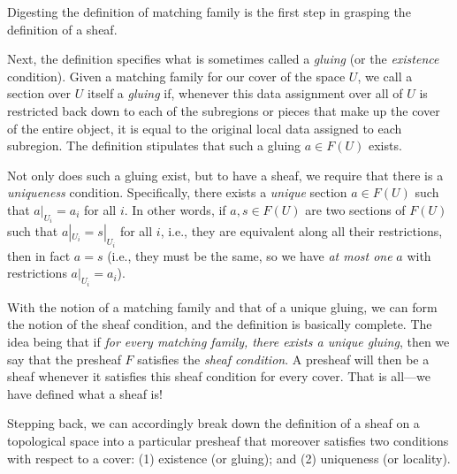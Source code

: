 \documentclass[a4paper]{book}
\theoremstyle{definition}
\theoremstyle{definition}
\theoremstyle{definition}
\theoremstyle{theorem}
\theoremstyle{definition}
\begin{document}
			Digesting the definition of matching family is the first step in grasping the definition of a sheaf. \par 
			Next, the definition specifies what is sometimes called a \textit{gluing} (or the \textit{existence} condition). Given a matching family for our cover of the space $U$, we call a section over $U$ itself a \textit{gluing} if, whenever this data assignment over all of $U$ is restricted back down to each of the subregions or pieces that make up the cover of the entire object, it is equal to the original local data assigned to each subregion. The definition stipulates that such a gluing $a \in F(U)$ exists.\par 
			Not only does such a gluing exist, but to have a sheaf, we require that there is a \textit{uniqueness} condition. Specifically, there exists a \textit{unique} section $a \in F(U)$ such that $a|_{U_i} = a_i$ for all $i$. In other words, if $a, s \in F(U)$ are two sections of $F(U)$ such that $a|_{U_i} = s|_{U_i}$ for all $i$, i.e., they are equivalent along all their restrictions, then in fact $a = s$ (i.e., they must be the same, so we have \textit{at most one} $a$ with restrictions $a|_{U_i} = a_i$). \par 
			With the notion of a matching family and that of a unique gluing, we can form the notion of the sheaf condition, and the definition is basically complete. The idea being that if \textit{for every matching family, there exists a unique gluing}, then we say that the presheaf $F$ satisfies the \textit{sheaf condition}. A presheaf will then be a sheaf whenever it satisfies this sheaf condition for every cover. That is all---we have defined what a sheaf is! \par 
	Stepping back, we can accordingly break down the definition of a sheaf on a topological space into a particular presheaf that moreover satisfies two conditions with respect to a cover: (1) existence (or gluing); and (2) uniqueness (or locality). 
\end{document}
